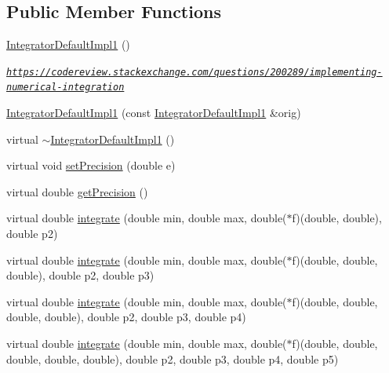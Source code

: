 \subsection*{Public Member Functions}
\begin{DoxyCompactItemize}
\item 
\hyperlink{class_integrator_default_impl1_a8c4c5650d14adf4a7d0f305aefd6252e}{Integrator\+Default\+Impl1} ()
\begin{DoxyCompactList}\small\item\em \href{https://codereview.stackexchange.com/questions/200289/implementing-numerical-integration}{\tt https\+://codereview.\+stackexchange.\+com/questions/200289/implementing-\/numerical-\/integration} \end{DoxyCompactList}\item 
\hyperlink{class_integrator_default_impl1_acc200c441cf35378c8ff7c05d3589b0c}{Integrator\+Default\+Impl1} (const \hyperlink{class_integrator_default_impl1}{Integrator\+Default\+Impl1} \&orig)
\item 
virtual \hyperlink{class_integrator_default_impl1_a78ccf2b88bd557ae7a97785f8f096ace}{$\sim$\+Integrator\+Default\+Impl1} ()
\item 
virtual void \hyperlink{class_integrator_default_impl1_a1011520ed0219b33a68746e9d740e346}{set\+Precision} (double e)
\item 
virtual double \hyperlink{class_integrator_default_impl1_aca5c537739f2fd62e8777496f891f171}{get\+Precision} ()
\item 
virtual double \hyperlink{class_integrator_default_impl1_a46e67c9c31df0ca3999f2b0645ef9999}{integrate} (double min, double max, double($\ast$f)(double, double), double p2)
\item 
virtual double \hyperlink{class_integrator_default_impl1_ad7c402421fa8a9b7d38da9b255aacc88}{integrate} (double min, double max, double($\ast$f)(double, double, double), double p2, double p3)
\item 
virtual double \hyperlink{class_integrator_default_impl1_ab029ba1412a8476753af2039ef2a242a}{integrate} (double min, double max, double($\ast$f)(double, double, double, double), double p2, double p3, double p4)
\item 
virtual double \hyperlink{class_integrator_default_impl1_a973a8ba5c37fedb80278fd6d09770c46}{integrate} (double min, double max, double($\ast$f)(double, double, double, double, double), double p2, double p3, double p4, double p5)
\end{DoxyCompactItemize}


